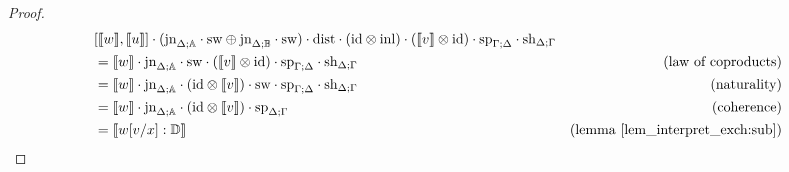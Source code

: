 \documentclass[10pt,a4paper]{amsart}
\theoremstyle{definition}
\theoremstyle{definition}
\theoremstyle{definition}
\theoremstyle{definition}
\theoremstyle{definition}
\theoremstyle{definition}
\begin{document}
\begin{proof}
\begin{align*}
  &  [\llbracket w\rrbracket,\llbracket u \rrbracket] \cdot (\text{jn}_{\Delta;\mathbb{A}} \cdot \mathrm{sw} \oplus \text{jn}_{\Delta;\mathbb{B}} \cdot \mathrm{sw}  ) \cdot \mathrm{dist} \cdot (\text{id} \otimes \mathrm{inl}) \cdot ( \llbracket  v \rrbracket \otimes \text{id}) \cdot \text{sp}_{\Gamma;\Delta} \cdot \text{sh}_{\Delta;\Gamma} \\
  & = \llbracket  w \rrbracket\cdot \text{jn}_{\Delta;\mathbb{A}} \cdot   \mathrm{sw} \cdot(\llbracket v \rrbracket \otimes  \text{id}) \cdot \text{sp}_{\Gamma;\Delta} \cdot \text{sh}_{\Delta; \Gamma}  & {\text{(law of coproducts)}} \\
  &=  \llbracket  w \rrbracket\cdot \text{jn}_{\Delta;\mathbb{A}}  \cdot(  \text{id}\otimes \llbracket v \rrbracket ) \cdot   \mathrm{sw} \cdot \text{sp}_{\Gamma;\Delta} \cdot \text{sh}_{\Delta; \Gamma} & {\text{(naturality)}} \\
  &= \llbracket w \rrbracket \cdot \text{jn}_{\Delta;\mathbb{A}} \cdot( \text{id} \otimes \llbracket v \rrbracket) \cdot \text{sp}_{\Delta;\Gamma}& {\text{(coherence)}}\\
  & = \llbracket w[v/x] : \mathbb{D} \rrbracket  & {\text{(lemma \ref{lem_interpret_exch:sub})}}
\end{align*}




\end{proof}
\end{document}
